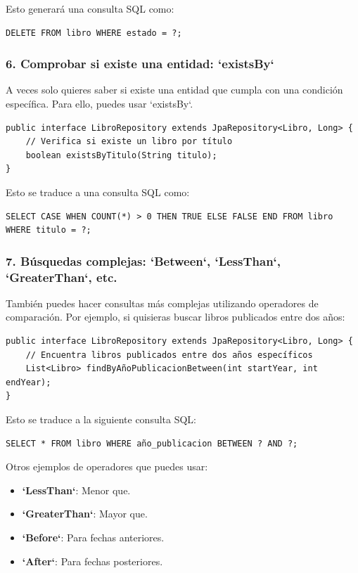 \documentclass[11pt]{article}
\begin{document}
Esto generará una consulta SQL como:

\begin{verbatim}
DELETE FROM libro WHERE estado = ?;
\end{verbatim}

\subsubsection{6. Comprobar si existe una entidad: `existsBy`}
\label{sec:orgf8cf346}
A veces solo quieres saber si existe una entidad que cumpla con una condición específica. Para ello, puedes usar `existsBy`.

\begin{verbatim}
public interface LibroRepository extends JpaRepository<Libro, Long> {
    // Verifica si existe un libro por título
    boolean existsByTitulo(String titulo);
}
\end{verbatim}

Esto se traduce a una consulta SQL como:

\begin{verbatim}
SELECT CASE WHEN COUNT(*) > 0 THEN TRUE ELSE FALSE END FROM libro WHERE titulo = ?;
\end{verbatim}

\subsubsection{7. Búsquedas complejas: `Between`, `LessThan`, `GreaterThan`, etc.}
\label{sec:org04ee214}
También puedes hacer consultas más complejas utilizando operadores de comparación. Por ejemplo, si quisieras buscar libros publicados entre dos años:

\begin{verbatim}
public interface LibroRepository extends JpaRepository<Libro, Long> {
    // Encuentra libros publicados entre dos años específicos
    List<Libro> findByAñoPublicacionBetween(int startYear, int endYear);
}
\end{verbatim}

Esto se traduce a la siguiente consulta SQL:

\begin{verbatim}
SELECT * FROM libro WHERE año_publicacion BETWEEN ? AND ?;
\end{verbatim}

Otros ejemplos de operadores que puedes usar:
\begin{itemize}
\item \textbf{\textbf{`LessThan`}}: Menor que.
\item \textbf{\textbf{`GreaterThan`}}: Mayor que.
\item \textbf{\textbf{`Before`}}: Para fechas anteriores.
\item \textbf{\textbf{`After`}}: Para fechas posteriores.
\end{itemize}
\end{document}
